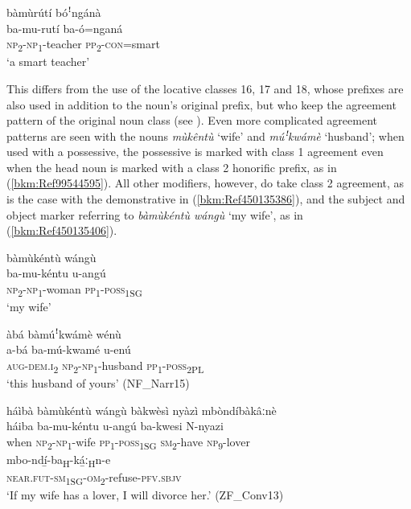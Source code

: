 \ea
\label{bkm:Ref450134818}
bàmùrútí bóꜝngánà\\
\gll ba-mu-rutí    ba-ó=nganá\\
\textsc{np}\textsubscript{2}-\textsc{np}\textsubscript{1}-teacher  \textsc{pp}\textsubscript{2}-\textsc{con}=smart\\
\glt ‘a smart teacher’
\z

This differs from the use of the locative classes 16, 17 and 18, whose prefixes are also used in addition to the noun’s original prefix, but who keep the agreement pattern of the original noun class (see ). Even more complicated agreement patterns are seen with the nouns \textit{mùkêntù} ‘wife’ and \textit{múꜝ}\textit{kwámè} ‘husband’; when used with a possessive, the possessive is marked with class 1 agreement even when the head noun is marked with a class 2 honorific prefix, as in (\ref{bkm:Ref99544595}). All other modifiers, however, do take class 2 agreement, as is the case with the demonstrative in (\ref{bkm:Ref450135386}), and the subject and object marker referring to \textit{bàmùkéntù wángù} ‘my wife’, as in (\ref{bkm:Ref450135406}).

\ea
\label{bkm:Ref99544595}
bàmùkéntù wángù\\
\gll ba-mu-kéntu  u-angú\\
\textsc{np}\textsubscript{2}-\textsc{np}\textsubscript{1}-woman  \textsc{pp}\textsubscript{1}-\textsc{poss}\textsubscript{1SG}\\
\glt ‘my wife’
\z

\ea
\label{bkm:Ref450135386}
àbá bàmúꜝkwámè wénù\\
\gll a-bá    ba-mú-kwamé  u-enú\\
\textsc{aug}-\textsc{dem}.\textsc{i}\textsubscript{2}  \textsc{np}\textsubscript{2}-\textsc{np}\textsubscript{1}-husband  \textsc{pp}\textsubscript{1}-\textsc{poss}\textsubscript{2PL}\\
\glt ‘this husband of yours’ (NF\_Narr15)
\z

\ea
\label{bkm:Ref450135406}
háìbà bàmùkéntù wángù bàkwèsì nyàzì mbòndíbàkâːnè \\
\gll háiba  ba-mu-kéntu  u-angú  ba-kwesi  N-nyazi\\
when  \textsc{np}\textsubscript{2}-\textsc{np}\textsubscript{1}-wife    \textsc{pp}\textsubscript{1}-\textsc{poss}\textsubscript{1SG}  \textsc{sm}\textsubscript{2}-have  \textsc{np}\textsubscript{9}-lover\\
mbo-ndí̲-ba\textsubscript{H}-ká̲ː\textsubscript{H}n-e\\
\textsc{near}.\textsc{fut}-\textsc{sm}\textsubscript{1SG}-\textsc{om}\textsubscript{2}-refuse-\textsc{pfv}.\textsc{sbjv}\\
\glt ‘If my wife has a lover, I will divorce her.’ (ZF\_Conv13)
\z

